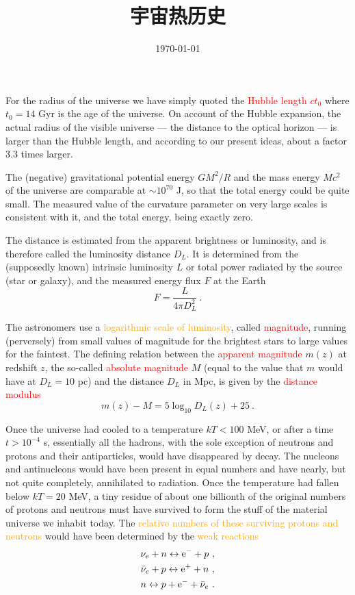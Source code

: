 \documentclass[12pt,a4paper]{article}
\title{宇宙热历史}
\author{}
\date{\today}
\begin{document}
\maketitle

\cite{perkins2008particle} For the radius of the universe we have simply quoted the \textcolor{red}{Hubble length $c t_0$} where $t_0 = 14$ Gyr is the age of the universe. On account of the Hubble expansion, the actual radius of the visible universe --- the distance to the optical horizon --- is larger than the Hubble length, and according to our present ideas, about a factor $3.3$ times larger. 

The (negative) gravitational potential energy $GM^2/R$ and the mass energy $M c^2$ of the universe are comparable at $\sim 10^{70}$ J, so that the total energy could be quite small. The measured value of the curvature parameter on very large scales is consistent with it, and the total energy, being exactly zero.

The distance is estimated from the apparent brightness or luminosity, and is therefore called the luminosity distance $D_L$. It is determined from the (supposedly known) intrinsic luminosity $L$ or total power radiated by the source (star or galaxy), and the measured energy flux $F$ at the Earth
\begin{equation}
F = \dfrac{L}{4\pi D_L^2} ~.
\end{equation}

The astronomers use a \textcolor{orange}{logarithmic scale of luminosity}, called \textcolor{red}{magnitude}, running (perversely) from small values of magnitude for the brightest stars to large values for the faintest. The defining relation between the \textcolor{red}{apparent magnitude} $m(z)$ at redshift $z$, the so-called \textcolor{red}{absolute magnitude} $M$ (equal to the value that $m$ would have at $D_L = 10$ pc) and the distance $D_L$ in Mpc, is given by the \textcolor{red}{distance modulus}
\begin{equation}
m(z) - M = 5 \log_{10} D_L(z) +25 ~.
\end{equation}

Once the universe had cooled to a temperature $kT < 100$ MeV, or after a time $t > 10^{-4}$ s, essentially all the hadrons, with the sole exception of neutrons and protons and their antiparticles, would have disappeared by decay. The nucleons and antinucleons would have been present
in equal numbers and have nearly, but not quite completely, annihilated to radiation. Once the temperature had fallen below $kT = 20$ MeV, a tiny residue of about one billionth of the original numbers of protons and neutrons must have survived to form the stuff of the material universe we inhabit today. The \textcolor{orange}{relative numbers of these surviving protons and neutrons} would have been determined by the \textcolor{orange}{weak reactions}
\begin{align}
\nu_{e} +n \leftrightarrow {\rm e}^- + p ~, \\
\bar{\nu}_e +p \leftrightarrow {\rm e}^+ + n ~, \\
n \leftrightarrow p +{\rm e}^- +\bar{\nu}_e ~.
\end{align}
\end{document}
